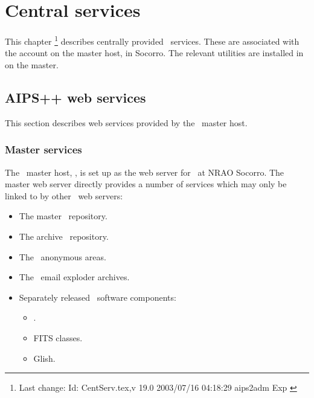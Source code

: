 \chapter{Central services}
\label{Central services}

This chapter \footnote{Last change:
$ $Id: CentServ.tex,v 19.0 2003/07/16 04:18:29 aips2adm Exp $ $}
describes centrally provided \aipspp\ services.  These are associated with
the  account on the master host,  in
Socorro.  The relevant utilities are installed in  on the
master.

 
\section{AIPS++ web services}
\label{web services}

This section describes web services provided by the \aipspp\ master host.

\subsection*{Master services}

The \aipspp\ master host, , is set up as the web server
for \aipspp\ at NRAO Socorro.  The master web server directly provides a
number of services which may only be linked to by other \aipspp\ web servers:

\begin{itemize}
\item
   The master \rcs\ repository.

\item
   The archive \rcs\ repository.

\item
   The \aipspp\ anonymous  areas.

\item
   The \aipspp\ email exploder archives.

\item
   Separately released \aipspp\ software components:
   \begin{itemize}
   \item
       .
   \item
       FITS classes.
   \item
       Glish.
   \end{itemize}
\end{itemize}

